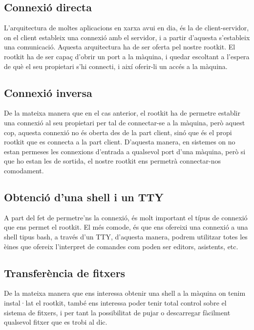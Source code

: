 \subsection{Connexió directa}
L'arquitectura de moltes aplicacions en xarxa avui en dia, és la de client-servidor, on el client estableix una connexió
amb el servidor, i a partir d'aquesta s'estableix una comunicació. Aquesta arquitectura ha de ser oferta pel nostre rootkit. 
El rootkit ha de ser capaç d'obrir un port a la màquina, i quedar escoltant a l'espera de què el seu propietari s'hi connecti,
i així oferir-li un accés a la màquina.

\subsection{Connexió inversa}
De la mateixa manera que en el cas anterior, el rootkit ha de permetre establir una connexió al seu propietari per tal de connectar-se
a la màquina, però aquest cop, aquesta connexió no és oberta des de la part client, sinó que és el propi rootkit que es connecta 
a la part client. D'aquesta manera, en sistemes on no estan permeses les connexions d'entrada a qualsevol port d'una màquina, però si
que ho estan les de sortida, el nostre rootkit ens permetrà connectar-nos comodament.

\subsection{Obtenció d'una shell i un TTY}
A part del fet de permetre'ns la connexió, és molt important el típus de connexió que ens permet el rootkit. El més comode, és que ens
ofereixi una connexió a una shell tipus bash, a través d'un TTY, d'aquesta manera, podrem utilitzar totes les èines
que ofereix l'interpret de comandes com poden ser editors, asistents, etc.

\subsection{Transferència de fitxers}
De la mateixa manera que ens interessa obtenir una shell a la màquina on tenim instal·lat el rootkit, també ens interessa
poder tenir total control sobre el sistema de fitxers, i per tant la possibilitat de pujar o descarregar fàcilment 
qualsevol fitxer que es trobi al dic.

